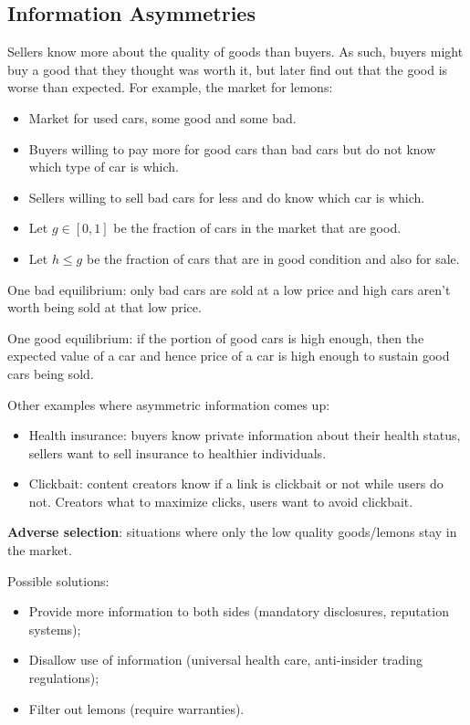 \documentclass[dvipsnames]{article}
\theoremstyle{definition}
\theoremstyle{remark}
\begin{document}
\subsection{Information Asymmetries}
Sellers know more about the quality of goods than buyers. As such, buyers might buy a good that they thought was worth it, but later find out that the good is worse than expected. For example, the market for lemons:
\begin{itemize}
	\item Market for used cars, some good and some bad.
	\item Buyers willing to pay more for good cars than bad cars but do not know which type of car is which.
	\item Sellers willing to sell bad cars for less and do know which car is which.
	\item Let $g \in [0,1]$ be the fraction of cars in the market that are good.
	\item Let $h \leq g$ be the fraction of cars that are in good condition and also for sale.
\end{itemize}
One bad equilibrium: only bad cars are sold at a low price and high cars aren't worth being sold at that low price.

One good equilibrium: if the portion of good cars is high enough, then the expected value of a car and hence price of a car is high enough to sustain good cars being sold.

Other examples where asymmetric information comes up:
\begin{itemize}
	\item Health insurance: buyers know private information about their health status, sellers want to sell insurance to healthier individuals.
	\item Clickbait: content creators know if a link is clickbait or not while users do not. Creators what to maximize clicks, users want to avoid clickbait. 
\end{itemize}

\textbf{Adverse selection}: situations where only the low quality goods/lemons stay in the market.

Possible solutions:
\begin{itemize}
	\item Provide more information to both sides (mandatory disclosures, reputation systems);
	\item Disallow use of information (universal health care, anti-insider trading regulations);
	\item Filter out lemons (require warranties).
\end{itemize}
\end{document}
